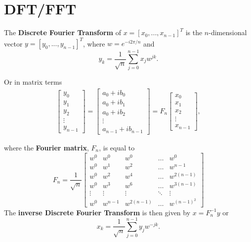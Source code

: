 \section{DFT/FFT}
\begin{definition}
The \textbf{Discrete Fourier Transform} of $x = [x_0,...,x_{n-1}]^T$ is the $n$-dimensional vector $y = [y_0,...,y_{n-1}]^T$, where $w = e^{-i2\pi/n}$ and
$$
y_k = \frac{1}{\sqrt{n}} \sum_{j=0}^{n-1}x_j w^{jk}.
$$
\end{definition}

Or in matrix terms
\begin{gather*}
\begin{bmatrix}
    y_0 \\
    y_1 \\
    y_2 \\
    \vdots \\
    y_{n-1}
\end{bmatrix}
=
\begin{bmatrix}
    a_0 + ib_0 \\
    a_0 + ib_1 \\
    a_0 + ib_2 \\
    \vdots \\
    a_{n-1} + ib_{n-1}
\end{bmatrix}
=
F_n
\begin{bmatrix}
    x_0 \\
    x_1 \\
    x_2 \\
    \vdots \\
    x_{n-1}
\end{bmatrix},
\end{gather*}

where the \textbf{Fourier matrix}, $F_n$, is equal to
$$
F_n = \frac{1}{\sqrt{n}}
\begin{bmatrix}
    w^0 & w^0 & w^0 & \hdots & w^0 \\
    w^0 & w^1 & w^2 & \hdots & w^{n-1} \\
    w^0 & w^2 & w^4 & \hdots & w^{2(n-1)} \\
    w^0 & w^3 & w^6 & \hdots & w^{3(n-1)} \\
    \vdots & \vdots & \vdots & \ddots & \vdots \\
    w^0 & w^{n-1} & w^{2(n-1)} & \hdots & w^{(n-1)^2}
\end{bmatrix}
$$
The \textbf{inverse Discrete Fourier Transform} is then given by $x = F_n^{-1}y$ or 
$$
x_k = \frac{1}{\sqrt{n}} \sum_{j=0}^{n-1}y_j w^{-jk}.
$$

